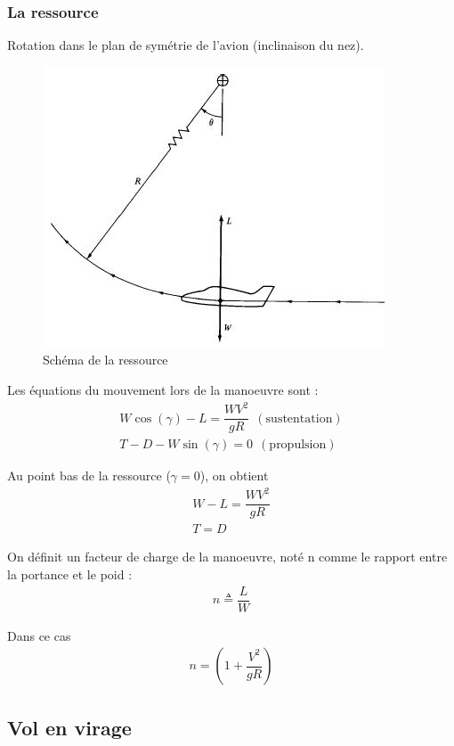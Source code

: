 \documentclass{report}
\begin{document}
\subsubsection{La ressource}
Rotation dans le plan de symétrie de l'avion (inclinaison du nez).

\begin{figure}[h!]
    \centering
    \includegraphics{16.JPG}
    \caption{Schéma de la ressource}
    \label{fig:my_label}
\end{figure}

Les équations du mouvement lors de la manoeuvre sont :
\begin{eqnarray}
W \cos(\gamma)-L=\dfrac{WV^2}{gR}~~(\text{sustentation})\\
T-D-W \sin(\gamma)=0~~(\text{propulsion})
\end{eqnarray}

Au point bas de la ressource ($\gamma=0$), on obtient
\begin{eqnarray}
W-L=\dfrac{W V^2}{gR}\\
T=D
\end{eqnarray}

On définit un facteur de charge de la manoeuvre, noté n comme le rapport entre la portance et le poid :
\begin{eqnarray}
n\triangleq \dfrac{L}{W}
\end{eqnarray}

Dans ce cas
\begin{eqnarray}
n=\left(1+\dfrac{V^2}{gR}\right)
\end{eqnarray}

\subsection{Vol en virage}
\end{document}
